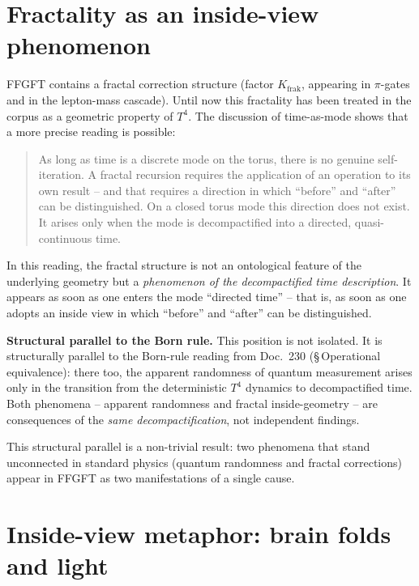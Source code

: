 \section{Fractality as an inside-view phenomenon}

FFGFT contains a fractal correction structure (factor $K_{\text{frak}}$,
appearing in $\pi$-gates and in the lepton-mass cascade). Until now
this fractality has been treated in the corpus as a geometric
property of $T^4$. The discussion of time-as-mode shows that a more
precise reading is possible:

\begin{quote}
As long as time is a discrete mode on the torus, there is no genuine
self-iteration. A fractal recursion requires the application of an
operation to its own result -- and that requires a direction in
which ``before'' and ``after'' can be distinguished. On a closed
torus mode this direction does not exist. It arises only when the
mode is decompactified into a directed, quasi-continuous time.
\end{quote}

In this reading, the fractal structure is not an ontological feature
of the underlying geometry but a \emph{phenomenon of the
decompactified time description}. It appears as soon as one enters
the mode ``directed time'' -- that is, as soon as one adopts an
inside view in which ``before'' and ``after'' can be distinguished.

\textbf{Structural parallel to the Born rule.} This position is not
isolated. It is structurally parallel to the Born-rule reading from
Doc.~230 (§\,Operational equivalence): there too, the apparent
randomness of quantum measurement arises only in the transition from
the deterministic $T^4$ dynamics to decompactified time. Both
phenomena -- apparent randomness and fractal inside-geometry -- are
consequences of the \emph{same decompactification}, not independent
findings.

This structural parallel is a non-trivial result: two phenomena that
stand unconnected in standard physics (quantum randomness and
fractal corrections) appear in FFGFT as two manifestations of a
single cause.

\section{Inside-view metaphor: brain folds and light}

